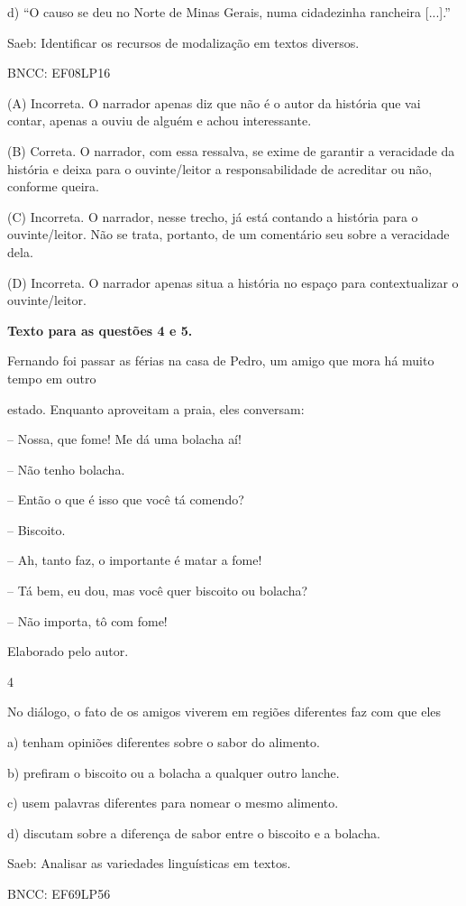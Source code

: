 d) ``O causo se deu no Norte de Minas Gerais, numa cidadezinha rancheira
{[}...{]}.''

Saeb: Identificar os recursos de modalização em textos diversos.

BNCC: EF08LP16

(A) Incorreta. O narrador apenas diz que não é o autor da história que
vai contar, apenas a ouviu de alguém e achou interessante.

(B) Correta. O narrador, com essa ressalva, se exime de garantir a
veracidade da história e deixa para o ouvinte/leitor a responsabilidade
de acreditar ou não, conforme queira.

(C) Incorreta. O narrador, nesse trecho, já está contando a história
para o ouvinte/leitor. Não se trata, portanto, de um comentário seu
sobre a veracidade dela.

(D) Incorreta. O narrador apenas situa a história no espaço para
contextualizar o ouvinte/leitor.

\textbf{Texto para as questões 4 e 5.}

Fernando foi passar as férias na casa de Pedro, um amigo que mora há
muito tempo em outro

estado. Enquanto aproveitam a praia, eles conversam:

-- Nossa, que fome! Me dá uma bolacha aí!

-- Não tenho bolacha.

-- Então o que é isso que você tá comendo?

-- Biscoito.

-- Ah, tanto faz, o importante é matar a fome!

-- Tá bem, eu dou, mas você quer biscoito ou bolacha?

-- Não importa, tô com fome!

Elaborado pelo autor.

\num{4}

No diálogo, o fato de os amigos viverem em regiões diferentes faz com
que eles

a) tenham opiniões diferentes sobre o sabor do alimento.

b) prefiram o biscoito ou a bolacha a qualquer outro lanche.

c) usem palavras diferentes para nomear o mesmo alimento.

d) discutam sobre a diferença de sabor entre o biscoito e a bolacha.

Saeb: Analisar as variedades linguísticas em textos.

BNCC: EF69LP56

